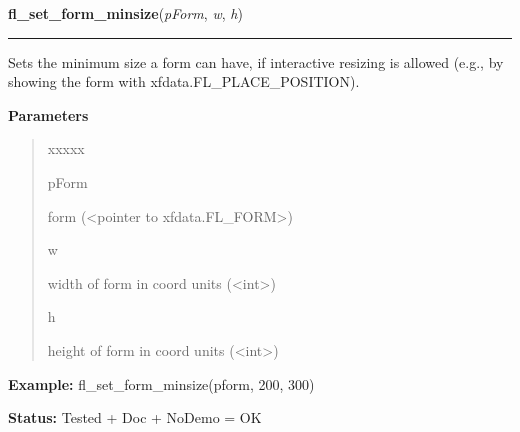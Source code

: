 \hspace{.8\funcindent}\begin{boxedminipage}{\funcwidth}

    \raggedright \textbf{fl\_set\_form\_minsize}(\textit{pForm}, \textit{w}, \textit{h})

    \vspace{-1.5ex}

    \rule{\textwidth}{0.5\fboxrule}
\setlength{\parskip}{2ex}
    Sets the minimum size a form can have, if interactive resizing is 
    allowed (e.g., by showing the form with xfdata.FL\_PLACE\_POSITION).

\setlength{\parskip}{1ex}
      \textbf{Parameters}
      \vspace{-1ex}

      \begin{quote}
        \begin{Ventry}{xxxxx}

          \item[pForm]

          form ({\textless}pointer to xfdata.FL\_FORM{\textgreater})

          \item[w]

          width of form in coord units ({\textless}int{\textgreater})

          \item[h]

          height of form in coord units ({\textless}int{\textgreater})

        \end{Ventry}

      \end{quote}

\textbf{Example:} fl\_set\_form\_minsize(pform, 200, 300)



\textbf{Status:} Tested + Doc + NoDemo = OK



    \end{boxedminipage}

    \label{xformslib:library:fl_set_form_maxsize}

    \vspace{0.5ex}

